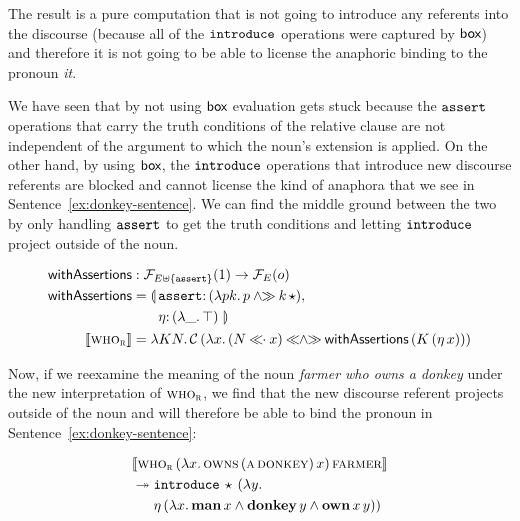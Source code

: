 The result is a pure computation that is not going to introduce any
referents into the discourse (because all of the $\mathtt{introduce}$
operations were captured by $\textsf{box}$) and therefore it is not going to be
able to license the anaphoric binding to the pronoun \emph{it}.

We have seen that by not using $\textsf{box}$ evaluation gets stuck because the
$\mathtt{assert}$ operations that carry the truth conditions of the relative
clause are not independent of the argument to which the noun's extension is
applied. On the other hand, by using $\textsf{box}$, the $\mathtt{introduce}$
operations that introduce new discourse referents are blocked and cannot
license the kind of anaphora that we see in
Sentence~\ref{ex:donkey-sentence}. We can find the middle ground between
the two by only handling $\mathtt{assert}$ to get the truth conditions and
letting $\mathtt{introduce}$ project outside of the noun.

\begin{align*}
  \withAssertions &: \FF_{E \uplus \{\op{assert}\}}(1) \to \FF_E(o) \\
  \withAssertions &= \lban \begin{aligned}[t]
      &\onto{\op{assert}}{(\lam{p k}{p \andr \ap{k}{\star}})}, \\
      &\onto{\eta}{(\lam{\_}{\top})} \, \rban
    \end{aligned} \\
  \sem{\abs{who}_{\abs{r}}} &= \lam{K N}{\ap{\CC}{(\lam{x}{(N \apl x) \andlr \ap{\withAssertions}{(\ap{K}{(\etaE{x})})}})}}
\end{align*}

Now, if we reexamine the meaning of the noun \emph{farmer who owns a
  donkey} under the new interpretation of $\textsc{who}_{\textsc{r}}$, we find
that the new discourse referent projects outside of the noun and will
therefore be able to bind the pronoun in Sentence~\ref{ex:donkey-sentence}:

\begin{align*}
& \llbracket \textsc{who}_{\textsc{r}}\,(\lambda x.\, \textsc{owns}\,(\textsc{a}\,\textsc{donkey})\,x)\,\textsc{farmer} \rrbracket \\
& \twoheadrightarrow \begin{aligned}[t]
    &\mathtt{introduce}\,\star\,(\lambda y.\,  \\
    &\eta\,(\lambda x.\, \textbf{man}\,x \land \textbf{donkey}\,y \land \textbf{own}\,x\,y))\end{aligned}
\end{align*}

